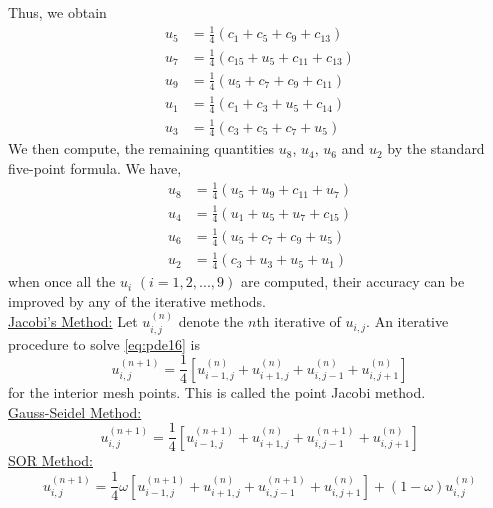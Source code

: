 \documentclass[../main-sheet.tex]{subfiles}
\begin{document}
\begin{ex}
    Thus, we obtain
    \begin{align*}
        u_5&=\frac{1}{4}(c_1+c_5+c_9+c_{13})\\
        u_7&=\frac{1}{4}(c_{15}+u_5+c_{11}+c_{13})\\
        u_9&=\frac{1}{4}(u_{5}+c_7+c_{9}+c_{11})\\
        u_1&=\frac{1}{4}(c_{1}+c_3+u_{5}+c_{14})\\
        u_3&=\frac{1}{4}(c_{3}+c_5+c_{7}+u_{5})
    \end{align*}
    We then compute, the remaining quantities \(u_8\), \(u_4\), \(u_6\) and \(u_2\) by the standard five-point formula. We have,
    \begin{align*}
        u_8&=\frac{1}{4}(u_5+u_9+c_{11}+u_{7})\\
        u_4&=\frac{1}{4}(u_{1}+u_5+u_{7}+c_{15})\\
        u_6&=\frac{1}{4}(u_{5}+c_7+c_{9}+u_{5})\\
        u_2&=\frac{1}{4}(c_{3}+u_3+u_{5}+u_{1})
    \end{align*}
    when once all the \(u_i\) \((i=1,2,...,9)\) are computed, their accuracy can be improved by any of the iterative methods.\\
    \underline{Jacobi's Method:} Let \(u_{i,j}^{(n)}\) denote the \(n\)th iterative of \(u_{i,j}\). An iterative procedure to solve \eqref{eq:pde16} is
    \begin{equation}
        u_{i,j}^{(n+1)}=\frac{1}{4}\left[ u_{i-1,j}^{(n)}+u_{i+1,j}^{(n)}+u_{i,j-1}^{(n)}+u_{i,j+1}^{(n)} \right] \label{eq:pde19}
    \end{equation}
    for the interior mesh points. This is called the point Jacobi method.\\
    \underline{Gauss-Seidel Method:}
    \begin{equation}
        u_{i,j}^{(n+1)}=\frac{1}{4}\left[ u_{i-1,j}^{(n+1)}+u_{i+1,j}^{(n)}+u_{i,j-1}^{(n+1)}+u_{i,j+1}^{(n)} \right] \label{eq:pde20}
    \end{equation}
    \underline{SOR Method:}
    \begin{equation}
        u_{i,j}^{(n+1)}=\frac{1}{4}\omega \left[ u_{i-1,j}^{(n+1)}+u_{i+1,j}^{(n)}+u_{i,j-1}^{(n+1)}+u_{i,j+1}^{(n)} \right]+(1-\omega)u_{i,j}^{(n)} \label{eq:pde21}
    \end{equation}
\end{ex}
\end{document}
